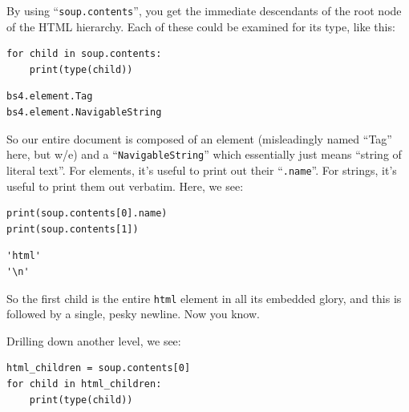 
By using ``\texttt{soup.contents}'', you get the immediate descendants of
the root node of the HTML hierarchy. Each of these could be examined for its
type, like this:


\begin{Verbatim}[fontsize=\small,samepage=true,frame=single,framesep=3mm]
for child in soup.contents:
    print(type(child))
\end{Verbatim}
\vspace{-.2in}

\begin{Verbatim}[fontsize=\small,samepage=true,frame=leftline,framesep=5mm,framerule=1mm]
bs4.element.Tag
bs4.element.NavigableString
\end{Verbatim}


So our entire document is composed of an element (misleadingly named ``Tag''
here, but w/e) and a ``\texttt{NavigableString}'' which essentially just means
``string of literal text''. For elements, it's useful to print out their
``\texttt{.name}''. For strings, it's useful to print them out verbatim. Here,
we see:

\begin{Verbatim}[fontsize=\small,samepage=true,frame=single,framesep=3mm]
print(soup.contents[0].name)
print(soup.contents[1])
\end{Verbatim}
\vspace{-.2in}

\begin{Verbatim}[fontsize=\small,samepage=true,frame=leftline,framesep=5mm,framerule=1mm]
'html'
'\n'
\end{Verbatim}


So the first child is the entire \texttt{html} element in all its embedded
glory, and this is followed by a single, pesky newline. Now you know.

Drilling down another level, we see:

\begin{Verbatim}[fontsize=\small,samepage=true,frame=single,framesep=3mm]
html_children = soup.contents[0]
for child in html_children:
    print(type(child))
\end{Verbatim}
\vspace{-.2in}

